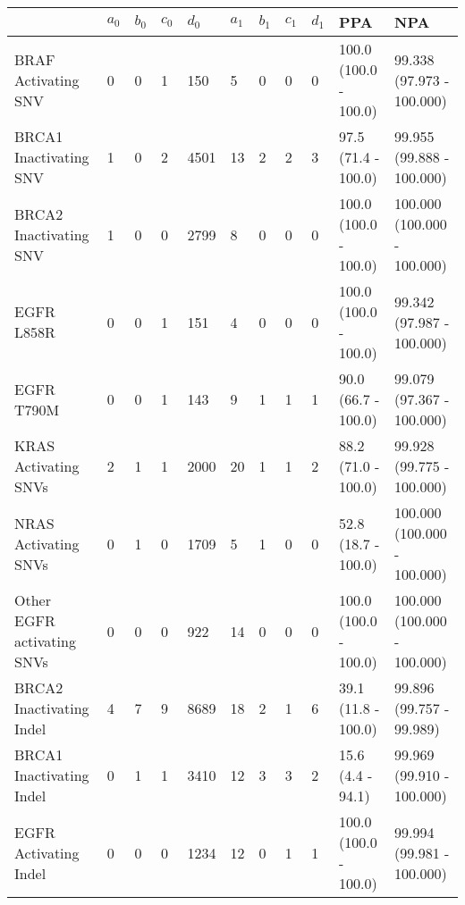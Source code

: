 \begin{tabular}{|l|l|l|l|l|l|l|l|l|l|l|}
\hline
\rowcolor[gray]{.85}{}                           & \textbf{$a_0$} & \textbf{$b_0$} & \textbf{$c_0$} & \textbf{$d_0$} & \textbf{$a_1$} & \textbf{$b_1$} & \textbf{$c_1$} & \textbf{$d_1$} & \textbf{PPA} & \textbf{                          NPA }\\ \hline
BRAF Activating SNV         &      0 &      0 &      1 &    150 &      5 &      0 &      0 &      0 &  100.0 (100.0 - 100.0) &    99.338 (97.973 - 100.000) \\ \hline
BRCA1 Inactivating SNV      &      1 &      0 &      2 &   4501 &     13 &      2 &      2 &      3 &    97.5 (71.4 - 100.0) &    99.955 (99.888 - 100.000) \\ \hline
BRCA2 Inactivating SNV      &      1 &      0 &      0 &   2799 &      8 &      0 &      0 &      0 &  100.0 (100.0 - 100.0) &  100.000 (100.000 - 100.000) \\ \hline
EGFR L858R                  &      0 &      0 &      1 &    151 &      4 &      0 &      0 &      0 &  100.0 (100.0 - 100.0) &    99.342 (97.987 - 100.000) \\ \hline
EGFR T790M                  &      0 &      0 &      1 &    143 &      9 &      1 &      1 &      1 &    90.0 (66.7 - 100.0) &    99.079 (97.367 - 100.000) \\ \hline
KRAS Activating SNVs        &      2 &      1 &      1 &   2000 &     20 &      1 &      1 &      2 &    88.2 (71.0 - 100.0) &    99.928 (99.775 - 100.000) \\ \hline
NRAS Activating SNVs        &      0 &      1 &      0 &   1709 &      5 &      1 &      0 &      0 &    52.8 (18.7 - 100.0) &  100.000 (100.000 - 100.000) \\ \hline
Other EGFR activating SNVs  &      0 &      0 &      0 &    922 &     14 &      0 &      0 &      0 &  100.0 (100.0 - 100.0) &  100.000 (100.000 - 100.000) \\ \hline
BRCA2 Inactivating Indel    &      4 &      7 &      9 &   8689 &     18 &      2 &      1 &      6 &    39.1 (11.8 - 100.0) &     99.896 (99.757 - 99.989) \\ \hline
BRCA1 Inactivating Indel    &      0 &      1 &      1 &   3410 &     12 &      3 &      3 &      2 &      15.6 (4.4 - 94.1) &    99.969 (99.910 - 100.000) \\ \hline
EGFR Activating Indel       &      0 &      0 &      0 &   1234 &     12 &      0 &      1 &      1 &  100.0 (100.0 - 100.0) &    99.994 (99.981 - 100.000) \\ \hline

\end{tabular}

